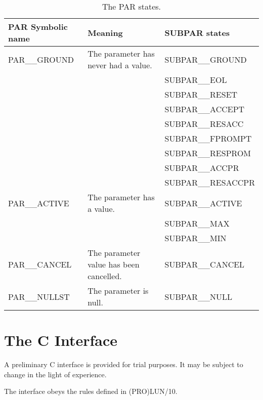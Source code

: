 \documentclass[twoside,11pt]{article}
\newcommand{\xlabel}[1]{}
\begin{document}
\begin{table}[h]
\caption{The PAR states.}
\begin{center}
\begin{tabular}{|l|l|l|}
\hline
PAR Symbolic name & Meaning & SUBPAR states \\ \hline
PAR\_\_GROUND & The parameter has never had a value.    & SUBPAR\_\_GROUND \\
              &                                         & SUBPAR\_\_EOL \\
              &                                         & SUBPAR\_\_RESET \\
              &                                         & SUBPAR\_\_ACCEPT \\
              &                                         & SUBPAR\_\_RESACC \\
              &                                         & SUBPAR\_\_FPROMPT \\
              &                                         & SUBPAR\_\_RESPROM \\
              &                                         & SUBPAR\_\_ACCPR \\
              &                                         & SUBPAR\_\_RESACCPR \\
PAR\_\_ACTIVE & The parameter has a value.              & SUBPAR\_\_ACTIVE \\
              &                                         & SUBPAR\_\_MAX \\
              &                                         & SUBPAR\_\_MIN \\
PAR\_\_CANCEL & The parameter value has been cancelled. & SUBPAR\_\_CANCEL \\
PAR\_\_NULLST & The parameter is null.                  & SUBPAR\_\_NULL \\ \hline
\end{tabular}
\end{center}
\end{table}

\section{\xlabel{the_c_interface}The C Interface}
A preliminary C interface is provided for trial purposes. It may be subject to
change in the light of experience.

The interface obeys the rules defined in (PRO)LUN/10.
\end{document}
